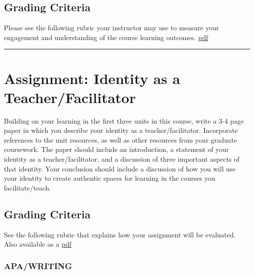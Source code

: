 \documentclass[
]{book}
\begin{document}
\hypertarget{grading-criteria}{%
\subsection*{Grading Criteria}\label{grading-criteria}}

Please see the following rubric your instructor may use to measure your engagement and understanding of the course learning outcomes. \href{assets/assessment/LDRS664_DiscussionRubric.pdf}{pdf}

\begin{center}\rule{0.5\linewidth}{0.5pt}\end{center}

\hypertarget{assignment-identity-as-a-teacherfacilitator}{%
\section*{Assignment: Identity as a Teacher/Facilitator}\label{assignment-identity-as-a-teacherfacilitator}}

\begin{assessment}
Building on your learning in the first three units in this course, write
a 3-4 page paper in which you describe your identity as a
teacher/facilitator. Incorporate references to the unit resources, as
well as other resources from your graduate coursework. The paper should
include an introduction, a statement of your identity as a
teacher/facilitator, and a discussion of three important aspects of that
identity. Your conclusion should include a discussion of how you will
use your identity to create authentic spaces for learning in the courses
you facilitate/teach.
\end{assessment}

\hypertarget{grading-criteria-1}{%
\subsection*{Grading Criteria}\label{grading-criteria-1}}

See the following rubric that explains how your assignment will be evaluated. Also available as a \href{assets/assessment/Identity-as-a-Teacher-RUBRIC.pdf}{pdf}

\hypertarget{apawriting}{%
\subsubsection*{APA/WRITING}\label{apawriting}}
\end{document}
